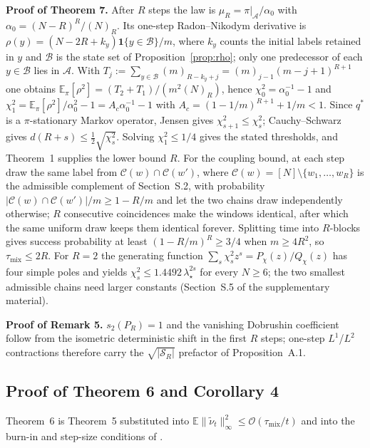 \documentclass[twoside,11pt]{article}
\begin{document}
\textbf{Proof of Theorem 7.} After $R$ steps the law is
$\mu_R=\pi|_{\mathcal{A}}/\alpha_0$ with $\alpha_0=(N-R)^R/(N)_R$. Its one-step
Radon--Nikodym derivative is
$\rho(y)=(N-2R+k_y)\mathbf{1}\{y\in\mathcal{B}\}/m$, where $k_y$ counts the initial
labels retained in $y$ and $\mathcal{B}$ is the state set of Proposition~\ref{prop:rho};
only
one predecessor of each $y\in\mathcal{B}$ lies in $\mathcal{A}$. With
$T_j:=\sum_{y\in\mathcal{B}}(m)_{R-k_y+j}=(m)_{j-1}(m-j+1)^{R+1}$ one obtains
$\mathbb{E}_\pi[\rho^2]=(T_2+T_1)/(m^2(N)_R)$, hence
$\chi^2_0=\alpha_0^{-1}-1$ and
$\chi^2_1=\mathbb{E}_\pi[\rho^2]/\alpha_0^2-1=A_c\alpha_0^{-1}-1$ with
$A_c=(1-1/m)^{R+1}+1/m<1$. Since $q^*$ is a $\pi$-stationary Markov
operator, Jensen gives $\chi^2_{s+1}\le\chi^2_s$; Cauchy--Schwarz gives
$d(R+s)\le\tfrac12\sqrt{\chi^2_s}$. Solving $\chi^2_1\le1/4$ gives the
stated thresholds, and Theorem~1 supplies the lower bound $R$. For the
coupling bound, at each step draw the same label from $\mathcal{C}(w)\cap\mathcal{C}(w')$,
where $\mathcal{C}(w)=[N]\setminus\{w_1,\dots,w_R\}$ is the admissible
complement of Section~S.2, with
probability $|\mathcal{C}(w)\cap\mathcal{C}(w')|/m\ge1-R/m$ and let the two chains draw
independently otherwise; $R$ consecutive coincidences make the windows
identical, after which the same uniform draw keeps them identical forever.
Splitting time into $R$-blocks gives success probability at least
$(1-R/m)^R\ge3/4$ when $m\ge4R^2$, so $\tau_{\mathrm{mix}}\le2R$. For
$R=2$ the generating function $\sum_s\chi^2_s z^s=P_\chi(z)/Q_\chi(z)$ has four
simple poles and yields $\chi^2_s\le1.4492\,\lambda_\star^{2s}$ for every
$N\ge6$; the two smallest admissible chains need larger constants (Section~S.5 of the supplementary material).

\textbf{Proof of Remark 5.} $s_2(P_R)=1$ and the vanishing Dobrushin
coefficient follow from the isometric deterministic shift in the first $R$
steps; one-step $L^1$/$L^2$ contractions therefore carry the
$\sqrt{|\mathcal{S}_R|}$ prefactor of Proposition~A.1.

\subsection{Proof of Theorem 6 and Corollary 4}
Theorem~6 is Theorem~5 substituted into
$\mathbb{E}\|\tilde\nu_t\|_\infty^{2}\leq\mathcal{O}(\tau_{\mathrm{mix}}/t)$
and into the burn-in and step-size conditions of \citep[Thm.~1]{ref1}.
\end{document}
